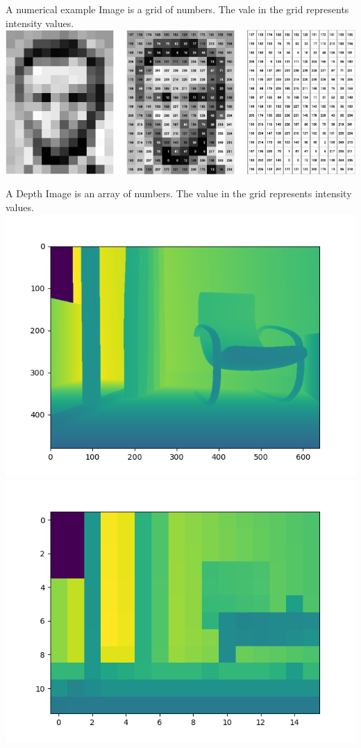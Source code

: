 \documentclass{beamer}
\begin{document}
  \begin{frame}{A numerical example}
    Image is a grid of numbers. The vale in the grid represents intensity values.
    \includegraphics[width=\linewidth]{media/image-as-a-matrix.png}
  \end{frame}

  \begin{frame}
    A Depth Image is an array of numbers. The value in the grid represents
    intensity values.\\
    \includegraphics[width=0.45\linewidth]{media/00000-depth.png}%
    \includegraphics[width=0.45\linewidth]{media/00000-depth-lowres.png}
  \end{frame}
\end{document}
